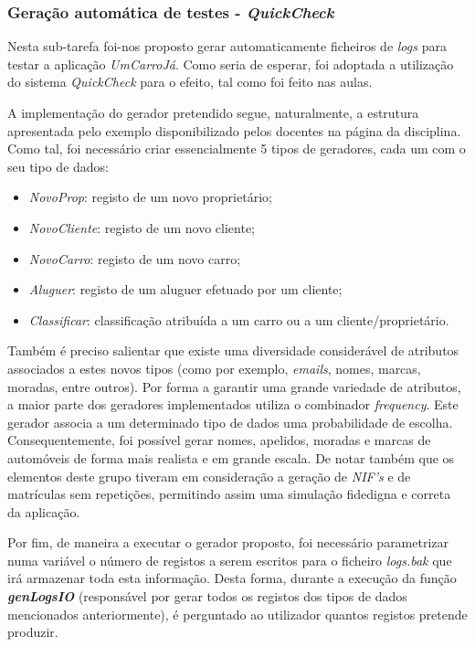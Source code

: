 \documentclass[a4paper]{report}
\begin{document}
\subsubsection{Geração automática de testes - \textit{QuickCheck}} \label{sssec:QuickCheckDemo1}
Nesta sub-tarefa foi-nos proposto gerar automaticamente ficheiros de \textit{logs} para testar a aplicação \textit{UmCarroJá}. Como seria de esperar, foi adoptada a utilização do sistema \textit{QuickCheck} para o efeito, tal como foi feito nas aulas.

A implementação do gerador pretendido segue, naturalmente, a estrutura apresentada pelo exemplo disponibilizado pelos docentes na página da disciplina. Como tal, foi necessário criar essencialmente 5 tipos de geradores, cada um com o seu tipo de dados:
\begin{itemize}
    \item \textit{NovoProp}: registo de um novo proprietário;
    \item \textit{NovoCliente}: registo de um novo cliente;
    \item \textit{NovoCarro}: registo de um novo carro;
    \item \textit{Aluguer}: registo de um aluguer efetuado por um cliente;
    \item \textit{Classificar}: classificação atribuída a um carro ou a um cliente/proprietário.
\end{itemize}

Também é preciso salientar que existe uma diversidade considerável de atributos associados a estes novos tipos (como por exemplo, \textit{emails}, nomes, marcas, moradas, entre outros). Por forma a garantir uma grande variedade de atributos, a maior parte dos geradores implementados utiliza o combinador \textit{frequency}. Este gerador associa a um determinado tipo de dados uma probabilidade de escolha. Consequentemente, foi possível gerar nomes, apelidos, moradas e marcas de automóveis de forma mais realista e em grande escala. De notar também que os elementos deste grupo tiveram em consideração a geração de \textit{NIF's} e de matrículas sem repetições, permitindo assim uma simulação fidedigna e correta da aplicação.

Por fim, de maneira a executar o gerador proposto, foi necessário parametrizar numa variável o número de registos a serem escritos para o ficheiro \textit{logs.bak} que irá armazenar toda esta informação. Desta forma, durante a execução da função \textbf{\textit{genLogsIO}} (responsável por gerar todos os registos dos tipos de dados mencionados anteriormente), é perguntado ao utilizador quantos registos pretende produzir.
\end{document}
